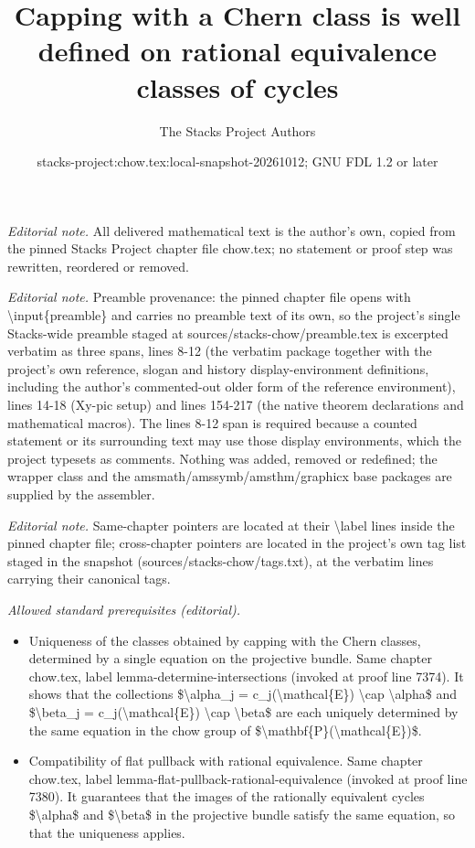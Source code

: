 \documentclass[10pt,a4paper]{amsart}
\title{Capping with a Chern class is well defined on rational equivalence classes of cycles}
\author{The Stacks Project Authors}
\date{stacks-project:chow.tex:local-snapshot-20261012; GNU FDL 1.2 or later}
\theoremstyle{plain}
\theoremstyle{definition}
\theoremstyle{remark}
\numberwithin{equation}{subsection}
\begin{document}
\maketitle
\noindent\textit{Editorial note.} All delivered mathematical text is the author's own, copied from the pinned Stacks Project chapter file chow.tex; no statement or proof step was rewritten, reordered or removed.\par\medskip
\noindent\textit{Editorial note.} Preamble provenance: the pinned chapter file opens with \textbackslash{}input\{preamble\} and carries no preamble text of its own, so the project's single Stacks-wide preamble staged at sources/stacks-chow/preamble.tex is excerpted verbatim as three spans, lines 8-12 (the verbatim package together with the project's own reference, slogan and history display-environment definitions, including the author's commented-out older form of the reference environment), lines 14-18 (Xy-pic setup) and lines 154-217 (the native theorem declarations and mathematical macros). The lines 8-12 span is required because a counted statement or its surrounding text may use those display environments, which the project typesets as comments. Nothing was added, removed or redefined; the wrapper class and the amsmath/amssymb/amsthm/graphicx base packages are supplied by the assembler.\par\medskip
\noindent\textit{Editorial note.} Same-chapter pointers are located at their \textbackslash{}label lines inside the pinned chapter file; cross-chapter pointers are located in the project's own tag list staged in the snapshot (sources/stacks-chow/tags.txt), at the verbatim lines carrying their canonical tags.\par\medskip
\noindent\textit{Allowed standard prerequisites (editorial).}\begin{itemize}
\item Uniqueness of the classes obtained by capping with the Chern classes, determined by a single equation on the projective bundle. Same chapter chow.tex, label lemma-determine-intersections (invoked at proof line 7374). It shows that the collections \$\textbackslash{}alpha\_j = c\_j(\textbackslash{}mathcal\{E\}) \textbackslash{}cap \textbackslash{}alpha\$ and \$\textbackslash{}beta\_j = c\_j(\textbackslash{}mathcal\{E\}) \textbackslash{}cap \textbackslash{}beta\$ are each uniquely determined by the same equation in the chow group of \$\textbackslash{}mathbf\{P\}(\textbackslash{}mathcal\{E\})\$.
\item Compatibility of flat pullback with rational equivalence. Same chapter chow.tex, label lemma-flat-pullback-rational-equivalence (invoked at proof line 7380). It guarantees that the images of the rationally equivalent cycles \$\textbackslash{}alpha\$ and \$\textbackslash{}beta\$ in the projective bundle satisfy the same equation, so that the uniqueness applies.
\end{itemize}\medskip
\end{document}
